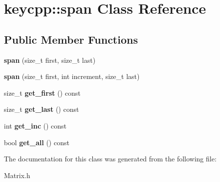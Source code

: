 \hypertarget{classkeycpp_1_1span}{\section{keycpp\-:\-:span Class Reference}
\label{classkeycpp_1_1span}
}
\subsection*{Public Member Functions}
\begin{DoxyCompactItemize}
\item 
\hypertarget{classkeycpp_1_1span_ad14b1ff84f399e89e68e585ef0df5e42}{{\bfseries span} (size\-\_\-t first, size\-\_\-t last)}\label{classkeycpp_1_1span_ad14b1ff84f399e89e68e585ef0df5e42}

\item 
\hypertarget{classkeycpp_1_1span_aa14489067efe56804337de9aa54db0fd}{{\bfseries span} (size\-\_\-t first, int increment, size\-\_\-t last)}\label{classkeycpp_1_1span_aa14489067efe56804337de9aa54db0fd}

\item 
\hypertarget{classkeycpp_1_1span_a2d08cfa7acc311ce4a84b643552b3c3d}{size\-\_\-t {\bfseries get\-\_\-first} () const }\label{classkeycpp_1_1span_a2d08cfa7acc311ce4a84b643552b3c3d}

\item 
\hypertarget{classkeycpp_1_1span_a79ff6d6e90e6b788d795ff7f58693233}{size\-\_\-t {\bfseries get\-\_\-last} () const }\label{classkeycpp_1_1span_a79ff6d6e90e6b788d795ff7f58693233}

\item 
\hypertarget{classkeycpp_1_1span_a889525badfe9ffd0e591b311a2b1272f}{int {\bfseries get\-\_\-inc} () const }\label{classkeycpp_1_1span_a889525badfe9ffd0e591b311a2b1272f}

\item 
\hypertarget{classkeycpp_1_1span_aacf4341d384dc0a5d5258feb626d6d0b}{bool {\bfseries get\-\_\-all} () const }\label{classkeycpp_1_1span_aacf4341d384dc0a5d5258feb626d6d0b}

\end{DoxyCompactItemize}


The documentation for this class was generated from the following file\-:\begin{DoxyCompactItemize}
\item 
Matrix.\-h\end{DoxyCompactItemize}
